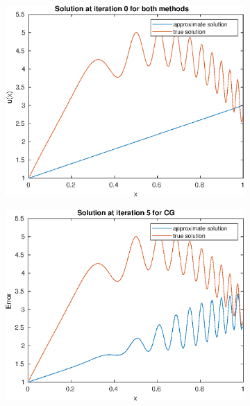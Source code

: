 \documentclass{article}
\begin{document}
\begin{figure}[H]
    \centering
    \begin{subfigure}{0.495\linewidth}
        \centering
        \includegraphics[width=\linewidth]{initial.eps}
    \end{subfigure}
    \begin{subfigure}{0.495\linewidth}
        \centering
        \includegraphics[width=\linewidth]{CG_i=5.eps}
    \end{subfigure}
    \begin{subfigure}{0.495\linewidth}
        \centering

\end{subfigure}
\end{figure}
\end{document}
